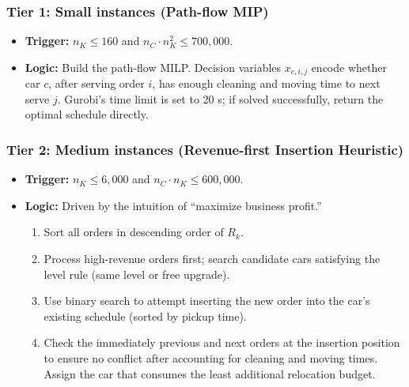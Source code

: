\documentclass[a4paper, 12pt]{article}
\begin{document}
    \subsubsection*{Tier 1: Small instances (Path-flow MIP)}
    \begin{itemize}
        \item \textbf{Trigger:} $n_K \le 160$ and $n_C\cdot n_K^2 \le 700{,}000$.
        \item \textbf{Logic:} Build the path-flow MILP. Decision variables $x_{c,i,j}$ encode whether car $c$, after serving order $i$, has enough cleaning and moving time to next serve $j$. Gurobi's time limit is set to 20 s; if solved successfully, return the optimal schedule directly.
    \end{itemize}

    \subsubsection*{Tier 2: Medium instances (Revenue-first Insertion Heuristic)}
    \begin{itemize}
        \item \textbf{Trigger:} $n_K \le 6{,}000$ and $n_C\cdot n_K \le 600{,}000$.
        \item \textbf{Logic:} Driven by the intuition of ``maximize business profit.''
        \begin{enumerate}[label=\textbf{\alph*.}]
            \item Sort all orders in descending order of $R_k$.
            \item Process high-revenue orders first; search candidate cars satisfying the level rule (same level or free upgrade).
            \item Use binary search to attempt inserting the new order into the car's existing schedule (sorted by pickup time).
            \item Check the immediately previous and next orders at the insertion position to ensure no conflict after accounting for cleaning and moving times. Assign the car that consumes the least additional relocation budget.
        \end{enumerate}
    \end{itemize}
\end{document}
